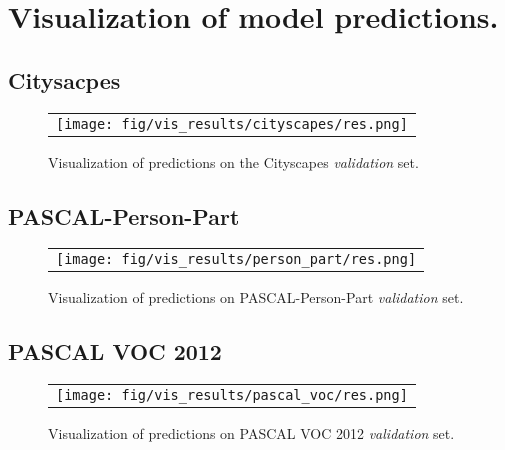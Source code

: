 \documentclass{article}
\begin{document}
\section{Visualization of model predictions.}

\subsection{Citysacpes}

\begin{figure}[h]
  \centering
  \begin{tabular}{c}
    \texttt{[image: fig/vis\_results/cityscapes/res.png]} \\
  \end{tabular}
  \caption{Visualization of predictions on the Cityscapes {\it validation} set.}
  \label{fig:vis_cityscapes}
\end{figure}


\subsection{PASCAL-Person-Part}

\begin{figure}[h]
  \centering
  \begin{tabular}{c}
    \texttt{[image: fig/vis\_results/person\_part/res.png]} \\
  \end{tabular}
  \caption{Visualization of predictions on PASCAL-Person-Part {\it validation} set.}
  \label{fig:vis_person_part}
\end{figure}

\subsection{PASCAL VOC 2012}

\begin{figure}[h]
  \centering
  \begin{tabular}{c}
    \texttt{[image: fig/vis\_results/pascal\_voc/res.png]} \\
  \end{tabular}
  \caption{Visualization of predictions on PASCAL VOC 2012 {\it validation} set.}
  \label{fig:vis_pascal_voc}
\end{figure}
 
\end{document}
